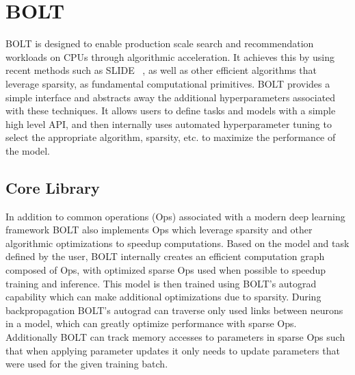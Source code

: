 \documentclass[sigconf]{acmart}
\begin{document}
\section{BOLT}

BOLT is designed to enable production scale search and recommendation workloads on CPUs through algorithmic acceleration. It achieves this by using recent methods such as SLIDE ~\cite{chen2020slide}, as well as other efficient algorithms that leverage sparsity, as fundamental computational primitives. BOLT provides a simple interface and abstracts away the additional hyperparameters associated with these techniques. It allows users to define tasks and models with a simple high level API, and then internally uses automated hyperparameter tuning to select the appropriate algorithm, sparsity, etc. to maximize the performance of the model. 



\subsection{Core Library}

In addition to common operations (Ops) associated with a modern deep learning framework BOLT also implements Ops which leverage sparsity and other algorithmic optimizations to speedup computations. Based on the model and task defined by the user, BOLT internally creates an efficient computation graph composed of Ops, with optimized sparse Ops used when possible to speedup training and inference. This model is then trained using BOLT's autograd capability which can make additional optimizations due to sparsity. During backpropagation BOLT's autograd can traverse only used links between neurons in a model, which can greatly optimize performance with sparse Ops. Additionally BOLT can track memory accesses to parameters in sparse Ops such that when applying parameter updates it only needs to update parameters that were used for the given training batch. 
\end{document}
